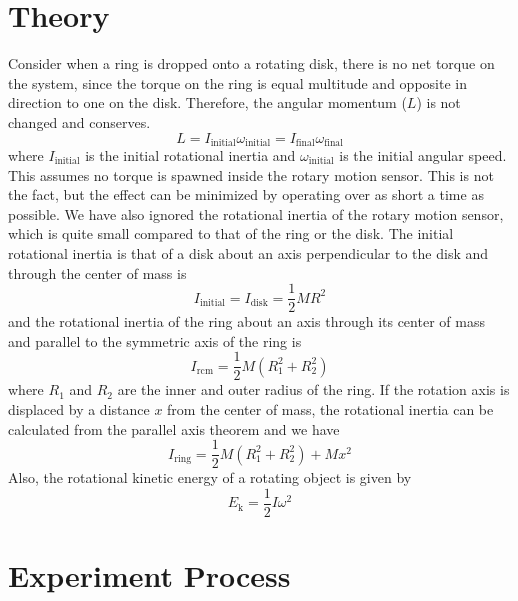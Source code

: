 \section{Theory}\label{sec:Theo}
Consider when a ring is dropped onto a rotating disk, there is no net torque on the system, since the torque on the ring is equal multitude and opposite in direction to one on the disk. Therefore, the angular momentum ($L$) is not changed and conserves.
\begin{equation}\label{eq:1}
  L=I_{\text{initial}}\omega_{\text{initial}}=I_{\text{final}}\omega_{\text{final}}
\end{equation}
where $I_{\text{initial}}$ is the initial rotational inertia and $\omega_{\text{initial}}$ is the initial angular speed. This assumes no torque is spawned inside the rotary motion sensor. This is not the fact, but the effect can be minimized by operating over as short a time as possible. We have also ignored the rotational inertia of the rotary motion sensor, which is quite small compared to that of the ring or the disk. The initial rotational inertia is that of a disk about an axis perpendicular to the disk and through the center of mass is
\begin{equation}\label{eq:2}
  I_{\text{initial}}=I_{\text{disk}}=\frac{1}{2}MR^2
\end{equation}
and the rotational inertia of the ring about an axis through its center of mass and parallel to the symmetric axis of the ring is
\begin{equation}\label{eq:3}
  I_{\text{rcm}}=\frac{1}{2}M(R_1^2+R_2^2)
\end{equation}
where $R_1$ and $R_2$ are the inner and outer radius of the ring. If the rotation axis is displaced by a distance $x$ from the center of mass, the rotational inertia can be calculated from the parallel axis theorem and we have
\begin{equation}\label{eq:4}
  I_{\text{ring}}=\frac{1}{2}M(R_1^2+R_2^2)+Mx^2
\end{equation}
Also, the rotational kinetic energy of a rotating object is given by
\begin{equation}\label{eq:5}
  E_{\text{k}}=\frac{1}{2}I\omega^2
\end{equation}

\section{Experiment Process}
